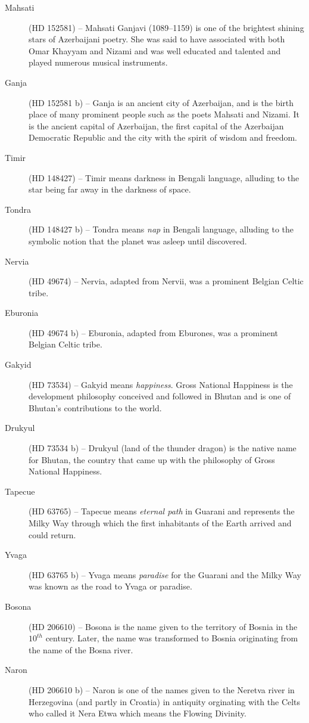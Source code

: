 \begin{description}
\item[Mahsati] (HD 152581) -- Mahsati Ganjavi (1089--1159) is one of the brightest shining stars of Azerbaijani poetry. She was said to have associated with both Omar Khayyam and Nizami and was well educated and talented and played numerous musical instruments.
\item[Ganja] (HD 152581 b) -- Ganja is an ancient city of Azerbaijan, and is the birth place of many prominent people such as the poets Mahsati and Nizami. It is the ancient capital of Azerbaijan, the first capital of the Azerbaijan Democratic Republic and the city with the spirit of wisdom and freedom.
\item[Timir] (HD 148427) -- Timir means darkness in Bengali language, alluding to the star being far away in the darkness of space.
\item[Tondra] (HD 148427 b) -- Tondra means \textit{nap} in Bengali language, alluding to the symbolic notion that the planet was asleep until discovered.
\item[Nervia] (HD 49674) -- Nervia, adapted from Nervii, was a prominent Belgian Celtic tribe.
\item[Eburonia] (HD 49674 b) -- Eburonia, adapted from Eburones, was a prominent Belgian Celtic tribe.
\item[Gakyid] (HD 73534) -- Gakyid means \textit{happiness}. Gross National Happiness is the development philosophy conceived and followed in Bhutan and is one of Bhutan's contributions to the world.
\item[Drukyul] (HD 73534 b) -- Drukyul (land of the thunder dragon) is the native name for Bhutan, the country that came up with the philosophy of Gross National Happiness.
\item[Tapecue] (HD 63765) -- Tapecue means \textit{eternal path} in Guarani and represents the Milky Way through which the first inhabitants of the Earth arrived and could return.
\item[Yvaga] (HD 63765 b) -- Yvaga means \textit{paradise} for the Guarani and the Milky Way was known as the road to Yvaga or paradise.
\item[Bosona] (HD 206610) -- Bosona is the name given to the territory of Bosnia in the $10^{th}$ century. Later, the name was transformed to Bosnia originating from the name of the Bosna river.
\item[Naron] (HD 206610 b) -- Naron is one of the names given to the Neretva river in Herzegovina (and partly in Croatia) in antiquity orginating with the Celts who called it Nera Etwa which means the Flowing Divinity.

\end{description}

